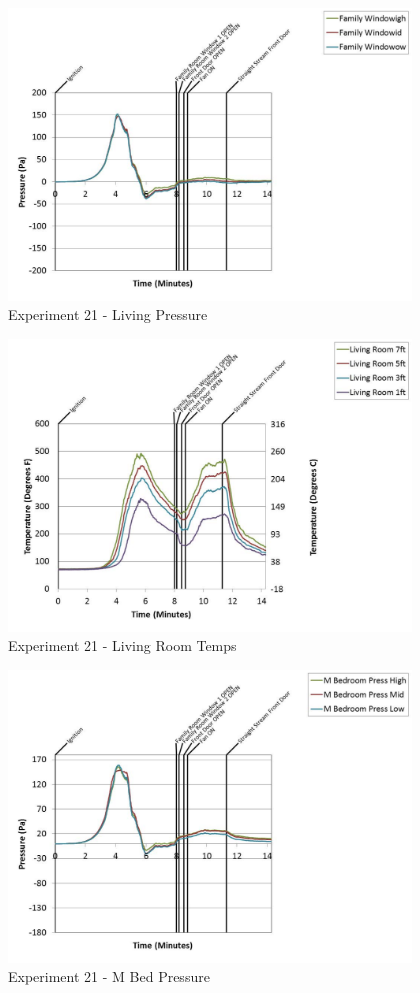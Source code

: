 \documentclass{article}
\begin{document}
\begin{appendices}
	\begin{figure}[h!]
		\centering
		\includegraphics[height=3.05in]{0_Images/Results_Charts/Exp_21_Charts/LivingPressure.pdf}
		\caption{Experiment 21 - Living Pressure}
	\end{figure}
 
	\clearpage

	\begin{figure}[h!]
		\centering
		\includegraphics[height=3.05in]{0_Images/Results_Charts/Exp_21_Charts/LivingRoomTemps.pdf}
		\caption{Experiment 21 - Living Room Temps}
	\end{figure}
 

	\begin{figure}[h!]
		\centering
		\includegraphics[height=3.05in]{0_Images/Results_Charts/Exp_21_Charts/MBedPressure.pdf}
		\caption{Experiment 21 - M Bed Pressure}
	\end{figure}
 

\end{appendices}
\end{document}
